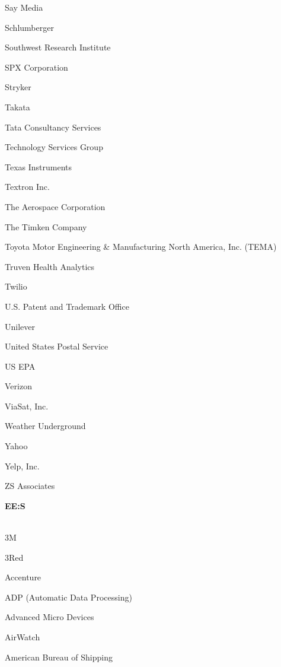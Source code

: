 \documentclass[twoside]{article}
\begin{document}
\begin{center}
\begin{multicols}{5}
\begin{FlushLeft}
\begin{compactitem}
\item Say Media
\item Schlumberger
\item Southwest Research Institute
\item SPX Corporation
\item Stryker
\item Takata
\item Tata Consultancy Services
\item Technology Services Group
\item Texas Instruments
\item Textron Inc.
\item The Aerospace Corporation
\item The Timken Company
\item Toyota Motor Engineering \& Manufacturing North America, Inc. (TEMA)
\item Truven Health Analytics
\item Twilio
\item U.S. Patent and Trademark Office
\item Unilever
\item United States Postal Service
\item US EPA
\item Verizon
\item ViaSat, Inc.
\item Weather Underground
\item Yahoo
\item Yelp, Inc.
\item ZS Associates
\end{compactitem}
        \end{FlushLeft}
        \vspace{1em}
        {\fontsize{14}{16}\selectfont \bf EE:S}\\
        \vspace{-1em}
        ~\hrulefill~
        \vspace{-.9em}
        \begin{FlushLeft}
        \begin{compactitem}
        \item 3M
\item 3Red
\item Accenture
\item ADP (Automatic Data Processing)
\item Advanced Micro Devices
\item AirWatch
\item American Bureau of Shipping

\end{compactitem}
\end{FlushLeft}
\end{multicols}
\end{center}
\end{document}
